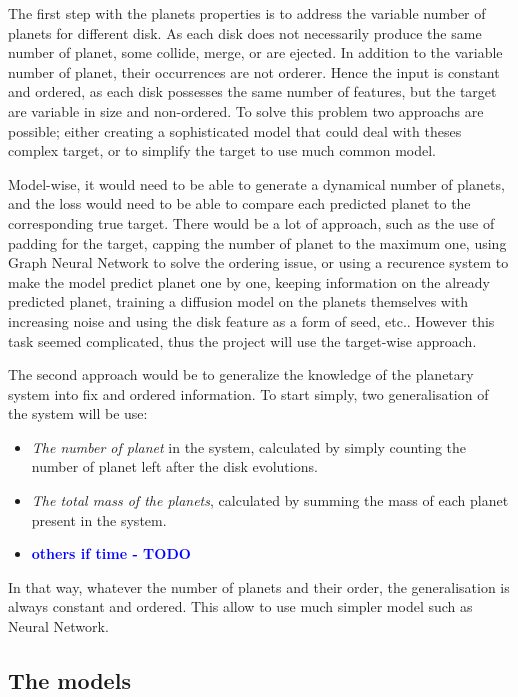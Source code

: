 \documentclass[a4paper, 11pt]{article}
\newcommand{\todonote}[3] {
	\textbf{\textcolor{#2}{#3 - #1}}
}
\newcommand{\todo}[1] {\todonote{TODO}{blue}{#1}}
\begin{document}
    The first step with the planets properties is to address the variable number of planets for different disk. As each disk does not necessarily produce the same number of planet, some collide, merge, or are ejected.  In addition to the variable number of planet, their occurrences are not orderer.  Hence the input is constant and ordered, as each disk possesses the same number of features, but the target are variable in size and non-ordered.  To solve this problem two approachs are possible; either creating a sophisticated model that could deal with theses complex target, or to simplify the target to use much common model.
    
    Model-wise, it would need to be able to generate a dynamical number of planets, and the loss would need to be able to compare each predicted planet to the corresponding true target. There would be a lot of approach, such as the use of padding for the target, capping the number of planet to the maximum one, using Graph Neural Network to solve the ordering issue, or using a recurence system to make the model predict planet one by one, keeping information on the already predicted planet, training a diffusion model on the planets themselves with increasing noise and using the disk feature as a form of seed, etc.. However this task seemed complicated, thus the project will use the target-wise approach.
    
    The second approach would be to generalize the knowledge of the planetary system into fix and ordered information. To start simply, two generalisation of the system will be use:
   
    \begin{itemize}
    	\setlength\itemsep{-.2em}
    	\item \textit{The number of planet} in the system, calculated by simply counting the number of planet left after the disk evolutions.
    	\item \textit{The total mass of the planets}, calculated by summing the mass of each planet present in the system.
    	\item \todo{others if time}
    \end{itemize}    
   In that way, whatever the number of planets and their order, the generalisation is always constant and ordered. This allow to use much simpler model such as Neural Network.    
    
    
    \subsection{The models}
    
\end{document}
